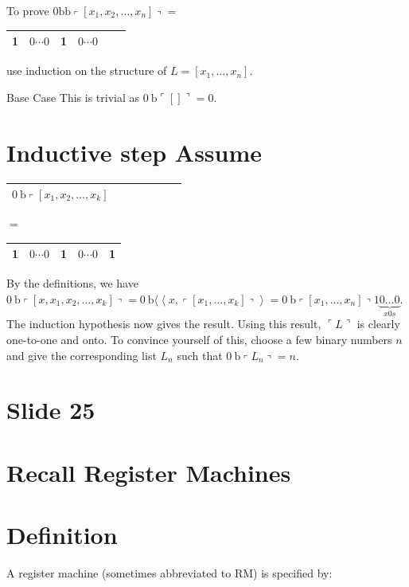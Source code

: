 \documentclass[10pt]{article}
\begin{document}
To prove $0 \mathrm{bb}\left\ulcorner\left[x_{1}, x_{2}, \ldots, x_{n}\right]\right\urcorner=$\begin{tabular}{|l|l|l|l|l|l|}
\hline
1 & $0 \cdots 0$ & 1 & $0 \cdots 0$ \\
\hline
\end{tabular} use induction on the structure of $L=\left[x_{1}, \ldots, x_{n}\right]$.

Base Case This is trivial as $0 \mathrm{~b}\ulcorner[]\urcorner=0$.

\section*{Inductive step Assume}
\begin{center}
\begin{tabular}{|l|l|l|l|l|l|l|}
\hline
$0 \mathrm{~b}\left\ulcorner\left[x_{1}, x_{2}, \ldots, x_{k}\right]\right.$ \\
\hline
\end{tabular}
\end{center}$=$\begin{tabular}{|l|l|l|l|l|}
\hline
1 & $0 \cdots 0$ & 1 & $0 \cdots 0$ & 1 \\
\hline
\end{tabular}

By the definitions, we have\\
$0 \mathrm{~b}\left\ulcorner\left[x, x_{1}, x_{2}, \ldots, x_{k}\right]\right\urcorner=0 \mathrm{~b}\langle\left\langle x,\left\ulcorner\left[x_{1}, \ldots, x_{k}\right]\right\urcorner\right\rangle=0 \mathrm{~b}\left\ulcorner\left[x_{1}, \ldots, x_{n}\right]\right\urcorner 1 \underbrace{0 \ldots 0}_{x 0 s}$.\\
The induction hypothesis now gives the result. Using this result, $\ulcorner L\urcorner$ is clearly one-to-one and onto. To convince yourself of this, choose a few binary numbers $n$ and give the corresponding list $L_{n}$ such that $0 \mathrm{~b}\left\ulcorner L_{n}\right\urcorner=n$.

\section*{Slide 25}
\section*{Recall Register Machines}
\section*{Definition}
A register machine (sometimes abbreviated to RM) is specified by:
\end{document}
